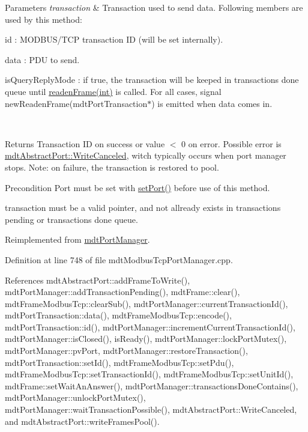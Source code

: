 \begin{DoxyParams}{Parameters}
{\em transaction} & Transaction used to send data. Following members are used by this method\-:
\begin{DoxyItemize}
\item id \-: M\-O\-D\-B\-U\-S/\-T\-C\-P transaction I\-D (will be set internally).
\item data \-: P\-D\-U to send.
\item is\-Query\-Reply\-Mode \-: if true, the transaction will be keeped in transactions done queue until \hyperlink{classmdt_port_manager_a830ae182d06dd6a52c43a7f45b9240ac}{readen\-Frame(int)} is called. For all cases, signal new\-Readen\-Frame(mdt\-Port\-Transaction$\ast$) is emitted when data comes in.
\end{DoxyItemize}\\
\hline
\end{DoxyParams}
\begin{DoxyReturn}{Returns}
Transaction I\-D on success or value $<$ 0 on error. Possible error is \hyperlink{classmdt_abstract_port_ad4121bb930c95887e77f8bafa065a85eae50ff4a9393507ad39005ddc7d5be42f}{mdt\-Abstract\-Port\-::\-Write\-Canceled}, witch typically occurs when port manager stops. Note\-: on failure, the transaction is restored to pool. 
\end{DoxyReturn}
\begin{DoxyPrecond}{Precondition}
Port must be set with \hyperlink{classmdt_port_manager_afcd156b2d0c9d340999935efb6cd8cb6}{set\-Port()} before use of this method. 

transaction must be a valid pointer, and not allready exists in transactions pending or transactions done queue. 
\end{DoxyPrecond}


Reimplemented from \hyperlink{classmdt_port_manager_ad98399edba146af5cf32a9002094385c}{mdt\-Port\-Manager}.



Definition at line 748 of file mdt\-Modbus\-Tcp\-Port\-Manager.\-cpp.



References mdt\-Abstract\-Port\-::add\-Frame\-To\-Write(), mdt\-Port\-Manager\-::add\-Transaction\-Pending(), mdt\-Frame\-::clear(), mdt\-Frame\-Modbus\-Tcp\-::clear\-Sub(), mdt\-Port\-Manager\-::current\-Transaction\-Id(), mdt\-Port\-Transaction\-::data(), mdt\-Frame\-Modbus\-Tcp\-::encode(), mdt\-Port\-Transaction\-::id(), mdt\-Port\-Manager\-::increment\-Current\-Transaction\-Id(), mdt\-Port\-Manager\-::is\-Closed(), is\-Ready(), mdt\-Port\-Manager\-::lock\-Port\-Mutex(), mdt\-Port\-Manager\-::pv\-Port, mdt\-Port\-Manager\-::restore\-Transaction(), mdt\-Port\-Transaction\-::set\-Id(), mdt\-Frame\-Modbus\-Tcp\-::set\-Pdu(), mdt\-Frame\-Modbus\-Tcp\-::set\-Transaction\-Id(), mdt\-Frame\-Modbus\-Tcp\-::set\-Unit\-Id(), mdt\-Frame\-::set\-Wait\-An\-Answer(), mdt\-Port\-Manager\-::transactions\-Done\-Contains(), mdt\-Port\-Manager\-::unlock\-Port\-Mutex(), mdt\-Port\-Manager\-::wait\-Transaction\-Possible(), mdt\-Abstract\-Port\-::\-Write\-Canceled, and mdt\-Abstract\-Port\-::write\-Frames\-Pool().



